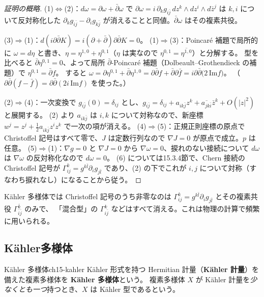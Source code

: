 \begin{proof}[証明の概略]
(1)$\Leftrightarrow$(2)：$d\omega = \partial\omega+\bar\partial\omega$ で
$\partial\omega = i\,\partial_k g_{i\bar j}\,dz^k\wedge dz^i\wedge d\bar z^j$ は $k,i$ について反対称化した $\partial_kg_{i\bar j}-\partial_ig_{k\bar j}$ が消えることと同値。$\bar\partial\omega$ はその複素共役。

(3)$\Rightarrow$(1)：$d(i\partial\bar\partial K) = i(\partial+\bar\partial)\partial\bar\partial K = 0$。
(1)$\Rightarrow$(3)：Poincar\'e 補題で局所的に $\omega = d\eta$ と書き、$\eta = \eta^{1,0}+\eta^{0,1}$（$\eta$ は実なので $\eta^{0,1} = \overline{\eta^{1,0}}$）と分解する。
型を比べると $\bar\partial\eta^{0,1} = 0$、よって局所 $\bar\partial$-Poincar\'e 補題（Dolbeault--Grothendieck の補題）で $\eta^{0,1} = \bar\partial f$。
すると $\omega = \partial\eta^{0,1}+\bar\partial\eta^{1,0} = \partial\bar\partial f + \bar\partial\partial\bar f = i\partial\bar\partial\big(2\,\mathrm{Im} f\big)$。
（$\partial\bar\partial(f-\bar f) = \partial\bar\partial(2i\,\mathrm{Im}f)$ を使った。）

(2)$\Rightarrow$(4)：一次変換で $g_{i\bar j}(0) = \delta_{ij}$ とし、$g_{i\bar j} = \delta_{ij} + a_{ik\bar j}z^k + \overline{a_{jk\bar i}}\bar z^k + O(|z|^2)$ と展開する。
(2) より $a_{ik\bar j}$ は $i,k$ について対称なので、新座標 $w^j = z^j + \frac12 a_{ik\bar j}z^iz^k$ で一次の項が消える。
(4)$\Rightarrow$(5)：正規正則座標の原点で Christoffel 記号はすべて零で、$J$ は定数行列なので $\nabla J=0$ が原点で成立。$p$ は任意。
(5)$\Rightarrow$(1)：$\nabla g = 0$ と $\nabla J=0$ から $\nabla\omega = 0$、捩れのない接続について $d\omega$ は $\nabla\omega$ の反対称化なので $d\omega = 0$。
(6) については15.3.4節で、Chern 接続の Christoffel 記号が $\Gamma^k_{ij} = g^{k\bar l}\partial_ig_{j\bar l}$ であり、(2) の下でこれが $i,j$ について対称（すなわち捩れなし）になることから従う。
\end{proof}

K\"ahler 多様体では Christoffel 記号のうち非零なのは $\Gamma^k_{ij} = g^{k\bar l}\partial_i g_{j\bar l}$ とその複素共役 $\Gamma^{\bar k}_{\bar i\bar j}$ のみで、
「混合型」の $\Gamma^k_{i\bar j}$ などはすべて消える。これは物理の計算で頻繁に用いられる。

\subsection{K\"ahler多様体}

\begin{mydef}{K\"ahler 多様体}{ch15-kahler}
K\"ahler 形式を持つ Hermitian 計量（\textbf{K\"ahler 計量}）を備えた複素多様体を \textbf{K\"ahler 多様体}という。
複素多様体 $X$ が K\"ahler 計量を\emph{少なくとも一つ}持つとき、$X$ は K\"ahler 型であるという。
\end{mydef}

